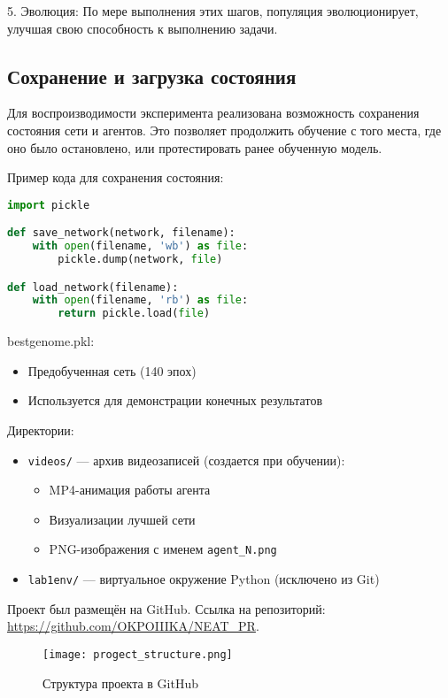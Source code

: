 \documentclass[a4paper,12pt]{article}
\begin{document}
5. Эволюция: По мере выполнения этих шагов, популяция эволюционирует, улучшая свою способность к выполнению задачи.

\subsection{Сохранение и загрузка состояния}

Для воспроизводимости эксперимента реализована возможность сохранения состояния сети и агентов. Это позволяет продолжить обучение с того места, где оно было остановлено, или протестировать ранее обученную модель.

Пример кода для сохранения состояния:

\begin{lstlisting}[language=Python]
import pickle

def save_network(network, filename):
    with open(filename, 'wb') as file:
        pickle.dump(network, file)

def load_network(filename):
    with open(filename, 'rb') as file:
        return pickle.load(file)
\end{lstlisting}	
	bestgenome.pkl:
	\begin{itemize}
		\item Предобученная сеть (140 эпох)
		\item Используется для демонстрации конечных результатов
	\end{itemize}
	
	Директории:
	\begin{itemize}
		\item \texttt{videos/} --- архив видеозаписей (создается при обучении):
		\begin{itemize}
			\item MP4-анимация работы агента

		\end{itemize}
		\begin{itemize}
			\item Визуализации лучшей сети
			\item PNG-изображения с именем \texttt{agent\_N.png}
		\end{itemize}
		\item \texttt{lab1env/} --- виртуальное окружение Python (исключено из Git)
	\end{itemize}

Проект был размещён на GitHub.   
Ссылка на репозиторий: \url{https://github.com/OKPOIIIKA/NEAT_PR}.

\begin{figure}[H]
	\centering
	\texttt{[image: progect\_structure.png]}
	\caption{Структура проекта в GitHub}
	\label{fig:project_structure}
\end{figure}
\end{document}
